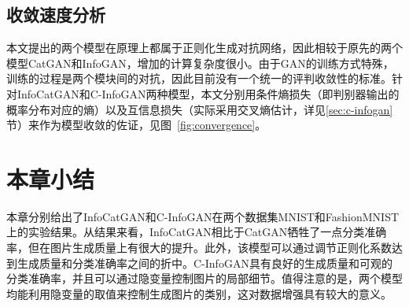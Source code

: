 \subsection{收敛速度分析}
本文提出的两个模型在原理上都属于正则化生成对抗网络，因此相较于原先的两个模型CatGAN和InfoGAN，增加的计算复杂度很小。由于GAN的训练方式特殊，训练的过程是两个模块间的对抗，因此目前没有一个统一的评判收敛性的标准。针对InfoCatGAN和C-InfoGAN两种模型，本文分别用条件熵损失（即判别器输出的概率分布对应的熵）以及互信息损失（实际采用交叉熵估计，详见\ref{sec:c-infogan}节）来作为模型收敛的佐证，见图~\ref{fig:convergence}。

\section{本章小结}
本章分别给出了InfoCatGAN和C-InfoGAN在两个数据集MNIST和FashionMNIST上的实验结果。从结果来看，InfoCatGAN相比于CatGAN牺牲了一点分类准确率，但在图片生成质量上有很大的提升。此外，该模型可以通过调节正则化系数达到生成质量和分类准确率之间的折中。C-InfoGAN具有良好的生成质量和可观的分类准确率，并且可以通过隐变量控制图片的局部细节。值得注意的是，两个模型均能利用隐变量的取值来控制生成图片的类别，这对数据增强具有较大的意义。
